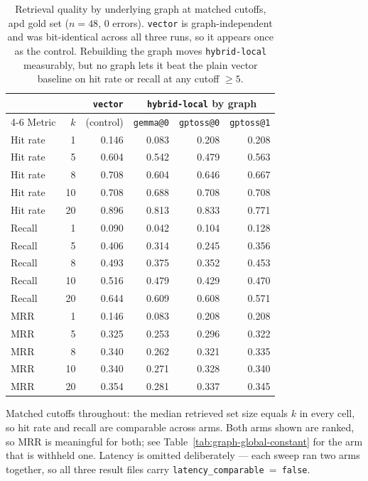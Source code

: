 \begin{table}[htbp]
  \centering
  \caption{Retrieval quality by underlying graph at matched cutoffs, apd gold set ($n=48$,
    0 errors). \texttt{vector} is graph-independent and was bit-identical across all three runs,
    so it appears once as the control. Rebuilding the graph moves \texttt{hybrid-local}
    measurably, but no graph lets it beat the plain vector baseline on hit rate or recall at any
    cutoff $\ge 5$.}
  \label{tab:retrieval-quality-by-graph}
  \begin{tabular}{lrrrrr}
    \toprule
    & & \texttt{vector} & \multicolumn{3}{c}{\texttt{hybrid-local} by graph} \\
    \cmidrule(lr){4-6}
    Metric & $k$ & (control) & \texttt{gemma@0} & \texttt{gptoss@0} & \texttt{gptoss@1} \\
    \midrule
    Hit rate &  1 & 0.146 & 0.083 & 0.208 & 0.208 \\
    Hit rate &  5 & 0.604 & 0.542 & 0.479 & 0.563 \\
    Hit rate &  8 & 0.708 & 0.604 & 0.646 & 0.667 \\
    Hit rate & 10 & 0.708 & 0.688 & 0.708 & 0.708 \\
    Hit rate & 20 & 0.896 & 0.813 & 0.833 & 0.771 \\
    \midrule
    Recall &  1 & 0.090 & 0.042 & 0.104 & 0.128 \\
    Recall &  5 & 0.406 & 0.314 & 0.245 & 0.356 \\
    Recall &  8 & 0.493 & 0.375 & 0.352 & 0.453 \\
    Recall & 10 & 0.516 & 0.479 & 0.429 & 0.470 \\
    Recall & 20 & 0.644 & 0.609 & 0.608 & 0.571 \\
    \midrule
    MRR &  1 & 0.146 & 0.083 & 0.208 & 0.208 \\
    MRR &  5 & 0.325 & 0.253 & 0.296 & 0.322 \\
    MRR &  8 & 0.340 & 0.262 & 0.321 & 0.335 \\
    MRR & 10 & 0.340 & 0.271 & 0.328 & 0.340 \\
    MRR & 20 & 0.354 & 0.281 & 0.337 & 0.345 \\
    \bottomrule
  \end{tabular}

  \vspace{0.5em}
  \footnotesize
  Matched cutoffs throughout: the median retrieved set size equals $k$ in every cell, so hit rate
  and recall are comparable across arms. Both arms shown are ranked, so MRR is meaningful for
  both; see Table~\ref{tab:graph-global-constant} for the arm that is withheld one. Latency is
  omitted deliberately --- each sweep ran two arms together, so all three result files carry
  \texttt{latency\_comparable}~=~\texttt{false}.
\end{table}
